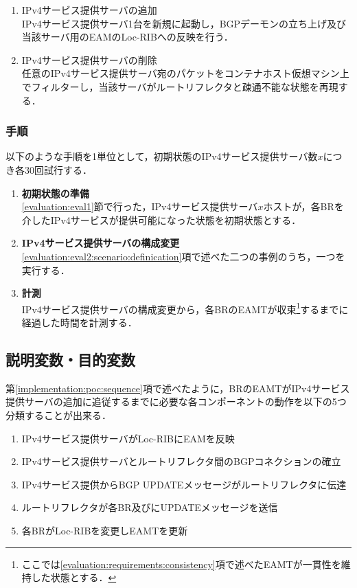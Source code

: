 \begin{enumerate}
    \item IPv4サービス提供サーバの追加 \\
    IPv4サービス提供サーバ1台を新規に起動し，BGPデーモンの立ち上げ及び当該サーバ用のEAMのLoc-RIBへの反映を行う． 
    \item IPv4サービス提供サーバの削除 \\
    任意のIPv4サービス提供サーバ宛のパケットをコンテナホスト仮想マシン上でフィルターし，当該サーバがルートリフレクタと疎通不能な状態を再現する．
\end{enumerate}


\subsubsection{手順}
以下のような手順を1単位として，初期状態のIPv4サービス提供サーバ数$x$につき各30回試行する．
\begin{enumerate}
    \item \textbf{初期状態の準備} \\
    \ref{evaluation:eval1}節で行った，IPv4サービス提供サーバ$x$ホストが，各BRを介したIPv4サービスが提供可能になった状態を初期状態とする．
    \item \textbf{IPv4サービス提供サーバの構成変更} \\
    \ref{evaluation:eval2:scenario:definication}項で述べた二つの事例のうち，一つを実行する．
    \item \textbf{計測} \\
    IPv4サービス提供サーバの構成変更から，各BRのEAMTが収束\footnote{ここでは\ref{evaluation:requirements:consistency}項で述べたEAMTが一貫性を維持した状態とする．}するまでに経過した時間を計測する．
\end{enumerate}

\subsection{説明変数・目的変数}
\label{evaluation:eval2:scenario:vars}

第\ref{implementation:poc:sequence}項で述べたように，BRのEAMTがIPv4サービス提供サーバの追加に追従するまでに必要な各コンポーネントの動作を以下の5つ分類することが出来る．
\begin{enumerate}
    \item IPv4サービス提供サーバがLoc-RIBにEAMを反映
    \item IPv4サービス提供サーバとルートリフレクタ間のBGPコネクションの確立
    \item IPv4サービス提供からBGP UPDATEメッセージがルートリフレクタに伝達
    \item ルートリフレクタが各BR及びにUPDATEメッセージを送信
    \item 各BRがLoc-RIBを変更しEAMTを更新
\end{enumerate}

